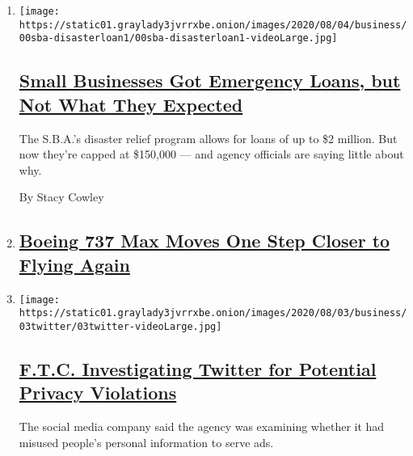 \begin{enumerate}
\def\labelenumi{\arabic{enumi}.}
\item
  \texttt{[image: https://static01.graylady3jvrrxbe.onion/images/2020/08/04/business/00sba-disasterloan1/00sba-disasterloan1-videoLarge.jpg]}

  \hypertarget{small-businesses-got-emergency-loans-but-not-what-they-expected}{%
  \subsection{\texorpdfstring{\href{/2020/08/03/business/small-business-loans-coronavirus.html}{Small
  Businesses Got Emergency Loans, but Not What They
  Expected}}{Small Businesses Got Emergency Loans, but Not What They Expected}}\label{small-businesses-got-emergency-loans-but-not-what-they-expected}}

  The S.B.A.'s disaster relief program allows for loans of up to \$2
  million. But now they're capped at \$150,000 --- and agency officials
  are saying little about why.

  By Stacy Cowley
\item
  \hypertarget{boeing-737-max-moves-one-step-closer-to-flying-again}{%
  \subsection{\texorpdfstring{\href{https://www.nytimes3xbfgragh.onion/live/2020/08/03/business/stock-market-today-coronavirus}{Boeing
  737 Max Moves One Step Closer to Flying
  Again}}{Boeing 737 Max Moves One Step Closer to Flying Again}}\label{boeing-737-max-moves-one-step-closer-to-flying-again}}
\item
  \texttt{[image: https://static01.graylady3jvrrxbe.onion/images/2020/08/03/business/03twitter/03twitter-videoLarge.jpg]}

  \hypertarget{ftc-investigating-twitter-for-potential-privacy-violations}{%
  \subsection{\texorpdfstring{\href{/2020/08/03/technology/ftc-twitter-privacy-violations.html}{F.T.C.
  Investigating Twitter for Potential Privacy
  Violations}}{F.T.C. Investigating Twitter for Potential Privacy Violations}}\label{ftc-investigating-twitter-for-potential-privacy-violations}}

  The social media company said the agency was examining whether it had
  misused people's personal information to serve ads.


\end{enumerate}
